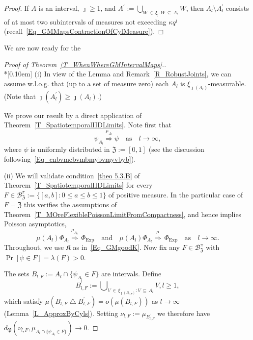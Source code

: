 \documentclass[10pt]{amsart}
\theoremstyle{definition}\newtheorem{defi}[theo]{Definition}\newtheorem{rema}[theo]{Remark}\newtheorem{exam}[theo]{Example}\newtheorem{exem}[theo]{Example}\newtheorem{nota}[theo]{Notation}
\newcommand{\clB}{\mathcal{B}}
\newcommand{\Expl}{\mathrm{Exp}}
\newcommand{\frkK}{\mathfrak{K}}
\newcommand{\frkP}{\mathfrak{P}}
\newcommand{\frkZ}{\mathfrak{Z}}
\begin{document}
\begin{proof}
If $A$ is an interval, $\jmath\geq1$, and $A^{\prime}:= {\textstyle\bigcup\nolimits_{W\,\in\,\xi_{\jmath}:W\,\subseteq\,A_{l}}} W$, then $A_{l}\setminus A_{l}^{\prime}$ consists of at most two subintervals of measures not exceeding $\kappa q^{\jmath}$ (recall~\eqref{Eq_GMMapsContractionOfCylMeasure}).
\end{proof}

We are now ready for the

\begin{proof}[{Proof of Theorem~\ref{T_WhenWhereGMIntervalMaps}.}]\ \\*[0.10em]
\noindent(i) In view of the Lemma and Remark~\ref{R_RobustJoints}, we can assume w.l.o.g. that (up to a set of measure zero) each $A_{l}$ is $\xi_{\jmath(A_{l})} $-measurable. (Note that $\jmath(A_{l}^{\prime})\geq\jmath(A_{l})$.)

We prove our result by a direct application of Theorem~\ref{T_SpatiotemporalIIDLimits}. Note first that
\begin{equation}
\psi_{A_{l}}\overset{\mu_{A_{l}}}{\Longrightarrow}\psi\quad\text{as}\quad l\rightarrow\infty,
\end{equation}
where $\psi$ is uniformly distributed in $\frkZ:=[0,1]$ (see the discussion following~\eqref{Eq_cnbvmcbvmbmybvmyvbyb}).

\vspace{6pt}
\noindent(ii) We will validate condition~\eqref{theo 5.3.B} of Theorem~\ref{T_SpatiotemporalIIDLimits} for every $F\in\clB_{\frkZ} ^{\pi}:=\{[a,b]:0\leq a\leq b\leq1\}$ of positive measure. In the particular case of $F=\frkZ$ this verifies the assumptions of Theorem~\ref{T_MOreFlexiblePoissonLimitFromCompactness}, and hence implies Poisson asymptotics,
\begin{equation}\label{Eq_PoiAsy}
\mu(A_{l})\Phi_{A_{l}}\overset{\mu_{A_{l}}}{\Longrightarrow}\,\Phi _{\Expl} \quad \text{and}\quad\mu(A_{l})\Phi_{A_{l}}\overset{\mu }{\Longrightarrow}\,\Phi_{\Expl}\quad \text{as}\quad l\rightarrow
\infty\text{.} 
\end{equation}
Throughout, we use $\frkK$ as in~\eqref{Eq_GMgoodK}. Now fix any $F\in\clB_{\frkZ}^{\pi}$ with $\Pr[\psi\in F]=\lambda(F)>0$.

The sets $B_{l,F}:=A_{l}\cap\{\psi_{A_{l}}\in F\}$ are intervals. Define 
\[
B_{l,F}^{\prime}:= {\textstyle\bigcup\nolimits_{V\,\in\,\xi_{\jmath(B_{l,F})}:V\,\subseteq\,A_{l}}} V, l\geq1,
\]
which satisfy $\mu(B_{l,F}\bigtriangleup B_{l,F}^{\prime})=o(\mu(B_{l,F}))$ as $l\rightarrow\infty$ (Lemma~\ref{L_ApproxByCyls}). Setting $\nu_{l,F}:=\mu_{B_{l,F}^{\prime}}$ we therefore have $d_{\frkP }(\nu_{l,F},\mu_{A_{l}\cap\{\psi_{A_{l}}\in F\}})\rightarrow0$.


\end{proof}
\end{document}
